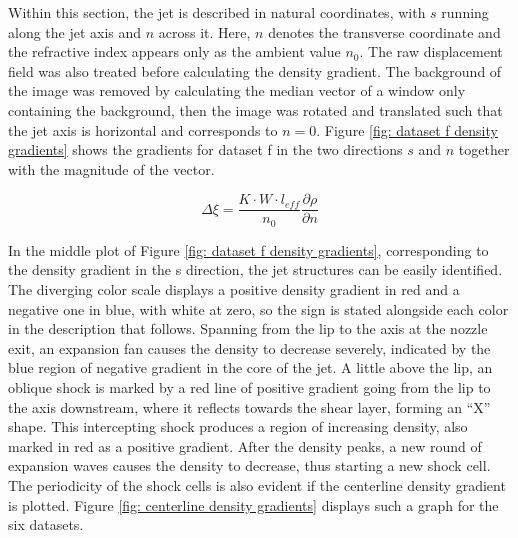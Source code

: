 Within this section, the jet is described in natural coordinates, with $s$ running along the jet axis and $n$ across it. Here, $n$ denotes the transverse coordinate and the refractive index appears only as the ambient value $n_0$. The raw displacement field was also treated before calculating the density gradient. The background of the image was removed by calculating the median vector of a window only containing the background, then the image was rotated and translated such that the jet axis is horizontal and corresponds to $n = 0$. Figure \ref{fig: dataset f density gradients} shows the gradients for dataset f in the two directions $s$ and $n$ together with the magnitude of the vector.

\begin{equation}
\label{equation: In-plane displacement}
    \Delta \xi = \frac{K\cdot W\cdot l_{eff}}{n_0}\frac{\partial \rho}{\partial n}
\end{equation}

In the middle plot of Figure \ref{fig: dataset f density gradients}, corresponding to the density gradient in the s direction, the jet structures can be easily identified. The diverging color scale displays a positive density gradient in red and a negative one in blue, with white at zero, so the sign is stated alongside each color in the description that follows. Spanning from the lip to the axis at the nozzle exit, an expansion fan causes the density to decrease severely, indicated by the blue region of negative gradient in the core of the jet. A little above the lip, an oblique shock is marked by a red line of positive gradient going from the lip to the axis downstream, where it reflects towards the shear layer, forming an ``X'' shape. This intercepting shock produces a region of increasing density, also marked in red as a positive gradient. After the density peaks, a new round of expansion waves causes the density to decrease, thus starting a new shock cell. The periodicity of the shock cells is also evident if the centerline density gradient is plotted. Figure \ref{fig: centerline density gradients} displays such a graph for the six datasets.


